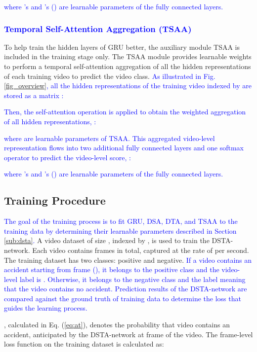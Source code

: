 \documentclass[journal]{IEEEtran}
\begin{document}
\textcolor{blue}{where 's and 's () are learnable parameters of the fully connected layers.}

\subsubsection{\textcolor{blue}{Temporal Self-Attention Aggregation (TSAA)}}
\label{sub:saa}

To help train the hidden layers of GRU better, the auxiliary module TSAA is included in the training stage only. The TSAA module provides learnable weights  to perform a temporal self-attention aggregation \cite{vaswani2017attention} of all the  hidden representations of each training video to predict the video class. \textcolor{blue}{As illustrated in Fig. \ref{fig_overview}, all the  hidden representations of the training video indexed by  are stored as a matrix :}

\textcolor{blue}{Then, the self-attention operation is applied to obtain the weighted aggregation of all hidden representations, : }

\textcolor{blue}{where  are learnable parameters of TSAA.}
\textcolor{blue}{This aggregated video-level representation flows into two additional fully connected layers and one softmax operator to predict the video-level score, :}

\textcolor{blue}{where 's and 's () are learnable parameters of the fully connected layers.}

\subsection{Training Procedure}
\textcolor{blue}{
The goal of the training process is to fit GRU, DSA, DTA, and TSAA to the training data by determining their learnable parameters described in Section \ref{sub:dsta}.} A video dataset of size , indexed by , is used to train the DSTA-network. Each video contains  frames in total, captured at the rate of  per second. The training dataset has two classes: positive and negative. \textcolor{blue}{If a video contains an accident starting from frame  (), it belongs to the positive class and the video-level label is . Otherwise, it belongs to the negative class and the label  meaning that the video contains no accident. Prediction results of the DSTA-network are compared against the ground truth of training data to determine the loss that guides the learning process.}

, calculated in Eq. (\ref{eq:at}),  denotes the probability that video  contains an accident, anticipated by the DSTA-network at frame  of the video. The frame-level loss function on the training dataset is calculated as:
\end{document}
